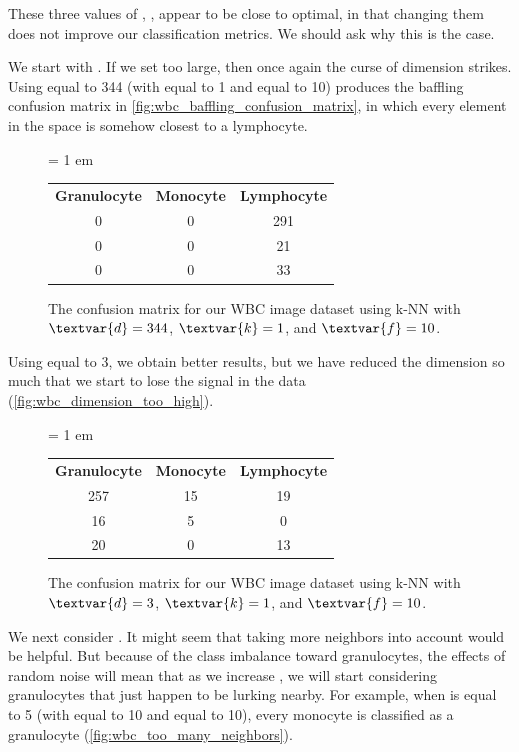 These three values of , ,  appear to be close to optimal, in that changing them does not improve our classification metrics. We should ask why this is the case.

We start with . If we set  too large, then once again the curse of dimension strikes. Using  equal to 344 (with  equal to 1 and  equal to 10) produces the baffling confusion matrix in \autoref{fig:wbc_baffling_confusion_matrix}, in which every element in the space is somehow closest to a lymphocyte.

\begin{figure}[h]
\centering
\tabcolsep = 1 em
\mySfFamily
\begin{tabular}{c c c}
\textbf{Granulocyte} & \textbf{Monocyte} & \textbf{Lymphocyte} \\
0 & 0 & 291 \\
0 & 0 & 21 \\
0 & 0 & 33
\end{tabular}
\caption{The confusion matrix for our WBC image dataset using k-NN with $\textvar{d} = \text{344}$, $\textvar{k} = \text{1}$, and $\textvar{f} = \text{10}$.}
\label{fig:wbc_baffling_confusion_matrix}
\end{figure}

Using  equal to 3, we obtain better results, but we have reduced the dimension so much that we start to lose the signal in the data (\autoref{fig:wbc_dimension_too_high}).\\

\begin{figure}[h]
\centering
\tabcolsep = 1 em
\mySfFamily
\begin{tabular}{c c c}
\textbf{Granulocyte} & \textbf{Monocyte} & \textbf{Lymphocyte} \\
257 & 15 & 19 \\
16 & 5 & 0 \\
20 & 0 & 13
\end{tabular}
\caption{The confusion matrix for our WBC image dataset using k-NN with $\textvar{d} = \text{3}$, $\textvar{k} = \text{1}$, and $\textvar{f} = \text{10}$.}
\label{fig:wbc_dimension_too_high}
\end{figure}

We next consider . It might seem that taking more neighbors into account would be helpful. But because of the class imbalance toward granulocytes, the effects of random noise will mean that as we increase , we will start considering granulocytes that just happen to be lurking nearby. For example, when  is equal to 5 (with  equal to 10 and  equal to 10), every monocyte is classified as a granulocyte (\autoref{fig:wbc_too_many_neighbors}).\\


